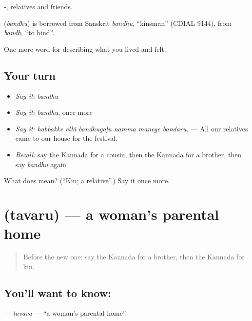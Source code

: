 -, relatives and friends.

\begin{cousinweb}
\textbf{} (\emph{bandhu}) is borrowed from Sanskrit \emph{bandhu}, \textquotedblleft{}kinsman\textquotedblright{} (CDIAL 9144), from \emph{bandh}, \textquotedblleft{}to bind\textquotedblright{}.
\end{cousinweb}

\begin{grammarlens}[title={What you've built}]
One more word for describing what you lived and felt.
\end{grammarlens}

\subsection*{Your turn}
\begin{itemize}
\raggedright
  \item \emph{Say it:} \emph{bandhu}
  \item \emph{Say it:} \emph{bandhu}, once more
  \item \emph{Say it:} \emph{habbakke ellā bandhugaḷu namma manege bandaru.} — All our relatives came to our house for the festival.
  \item \emph{Recall:} say the Kannada for a cousin, then the Kannada for a brother, then say \emph{bandhu} again
\end{itemize}

\begin{tcolorbox}[breakable,colback=teal!4,colframe=teal!35!black,title={Before you move on}]
What does  mean? (\textquotedblleft{}Kin; a relative\textquotedblright{}.) Say it once more.
\end{tcolorbox}
\section[\texorpdfstring{\kn{ತವರು} (tavaru)}{ತವರು (tavaru)}]{ (tavaru) — a woman's parental home}

\label{lesson:KA-C526-tavaru}



\begin{quote}
Before the new one: say the Kannada for a brother, then the Kannada for kin.
\end{quote}

\subsection*{You'll want to know: }
\textbf{} — \emph{tavaru} — \textquotedblleft{}a woman's parental home\textquotedblright{}.


